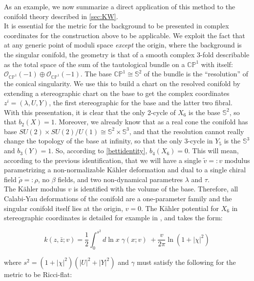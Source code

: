 As an example, we now summarize a direct application of this method to the conifold theory described in \ref{sec:KW}.\\

It is essential for the metric for the background to be presented in complex coordinates for the construction above to be applicable. We exploit the fact that at any generic point of moduli space \emph{except} the origin, where the background is the singular conifold, the geometry is that of a smooth complex 3-fold describable as the total space of the sum of the tautological bundle on a $\mathbb{CP}^1$ with itself: $\mathcal{O}_{\mathbb{CP}^1}(-1) \oplus \mathcal{O}_{\mathbb{CP}^1}(-1)$. The base $\mathbb{CP}^1 \cong \mathbb{S}^2$ of the bundle is the ``resolution'' of the conical singularity. We use this to build a chart on the resolved conifold by extending a stereographic chart on the base to get the complex coordinates $z^i = (\lambda, U, Y)$, the first stereographic for the base and the latter two fibral.\\

With this presentation, it is clear that the only 2-cycle of $X_6$ is the base $\mathbb{S}^2$, so that $b_2(X) = 1$. Moreover, we already know that as a real cone the conifold has base $SU(2)\times SU(2) / U(1) \cong \mathbb{S}^2 \times \mathbb{S}^3$, and that the resolution cannot really change the topology of the base at infinity, so that the only 3-cycle in $Y_5$ is the $\mathbb{S}^3$ and $b_3(Y) = 1$. So, according to \ref{bettidentity}, $b_4(X_6) = 0$. This will mean, according to the previous identification, that we will have a single $\tilde v =: v$ modulus parametrizing a non-normalizable K\"ahler deformation and dual to a single chiral field $\tilde\rho =: \rho$, no $\beta$ fields, and two non-dynamical parametres $\lambda$ and $\tau$. \\

The K\"ahler modulus $v$ is identified with the volume of the base. Therefore, all Calabi-Yau deformations of the conifold are a one-parameter family and the singular conifold itself lies at the origin, $v=0$. The K\"ahler potential for $X_6$ in stereographic coordinates is detailed for example in \cite{PandoZayas}, and takes the form:

\begin{equation}
	k(z,\bar z; v) = \frac{1}{2} \int_0^{s^2} d\ln x \; \gamma(x;v) \; + \frac{v}{2\pi} \ln(1+|\chi|^2)
	\label{}
\end{equation}

where $s^2 = (1+|\chi|^2)(|U|^2 + |Y|^2)$ and $\gamma$ must satisfy the following for the metric to be Ricci-flat:

